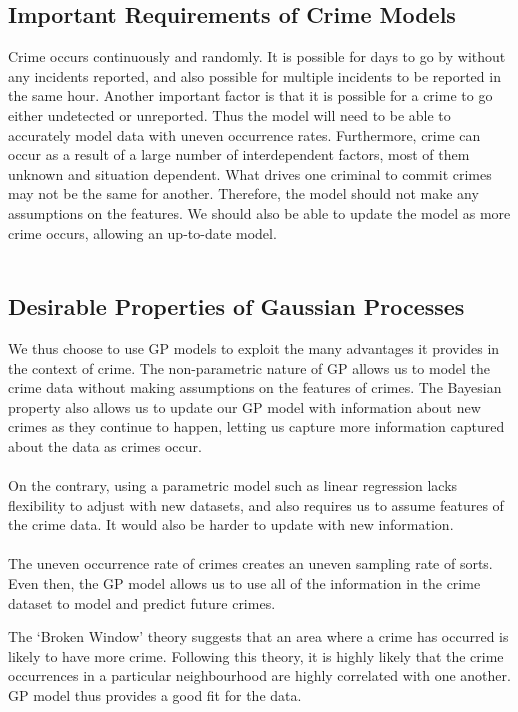 \documentclass[a4paper, 10pt, conference]{ieeeconf}
\begin{document}
	\subsection{Important Requirements of Crime Models}
	
	Crime occurs continuously and randomly. It is possible for days to go by without any incidents reported, and also possible for multiple incidents to be reported in the same hour.
	Another important factor is that it is possible for a crime to go either undetected or unreported. Thus the model will need to be able to accurately model data with uneven occurrence rates.
	Furthermore, crime can occur as a result of a large number of interdependent factors, most of them unknown and situation dependent. What drives one criminal to commit crimes may not be the same for another.
	Therefore, the model should not make any assumptions on the features. We should also be able to update the model as more crime occurs, allowing an up-to-date model.\\ \\
	\blindtext
	
	\subsection{Desirable Properties of Gaussian Processes}
	
	We thus choose to use GP models to exploit the many advantages it provides in the context of crime.
	The non-parametric nature of GP allows us to model the crime data without making assumptions on the features of crimes.
	The Bayesian property also allows us to update our GP model with information about new crimes as they continue to happen, letting us capture more information captured about the data as crimes occur.\\ \\

	On the contrary, using a parametric model such as linear regression lacks flexibility to adjust with new datasets, and also requires us to assume features of the crime data.
	It would also be harder to update with new information.\\ \\

	The uneven occurrence rate of crimes creates an uneven sampling rate of sorts.
	Even then, the GP model allows us to use all of the information in the crime dataset to model and predict future crimes.

	The ‘Broken Window’ theory suggests that an area where a crime has occurred is likely to have more crime. \cite{c07}
	Following this theory, it is highly likely that the crime occurrences in a particular neighbourhood are highly correlated with one another.
	GP model thus provides a good fit for the data.
\end{document}
